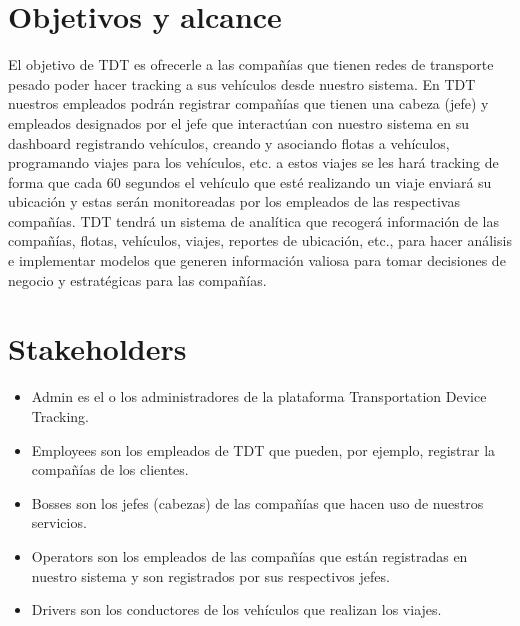 \documentclass{article}
\begin{document}
\section{Objetivos y alcance} 
El objetivo de TDT es ofrecerle a las compañías que tienen redes de transporte pesado poder hacer tracking a sus vehículos desde nuestro sistema. En TDT nuestros empleados podrán registrar compañías que tienen una cabeza (jefe) y empleados designados por el jefe que interactúan con nuestro sistema en su dashboard registrando vehículos, creando y asociando flotas a vehículos, programando viajes para los vehículos, etc. a estos viajes se les hará tracking de forma que cada 60 segundos el vehículo que esté realizando un viaje enviará su ubicación y estas serán monitoreadas por los empleados de las respectivas compañías. TDT tendrá un sistema de analítica que recogerá información de las compañías, flotas, vehículos, viajes, reportes de ubicación, etc., para hacer análisis e implementar modelos que generen información valiosa para tomar decisiones de negocio y estratégicas para las compañías.

\section{Stakeholders}

\begin{itemize}
    \item{Admin} es el o los administradores de la plataforma Transportation Device Tracking.
    \item{Employees} son los empleados de TDT que pueden, por ejemplo, registrar la compañías de los clientes.
    \item{Bosses} son los jefes (cabezas) de las compañías que hacen uso de nuestros servicios.
    \item{Operators} son los empleados de las compañías que están registradas en nuestro sistema y son registrados por sus respectivos jefes.
    \item{Drivers} son los conductores de los vehículos que realizan los viajes.
\end{itemize}
\end{document}
